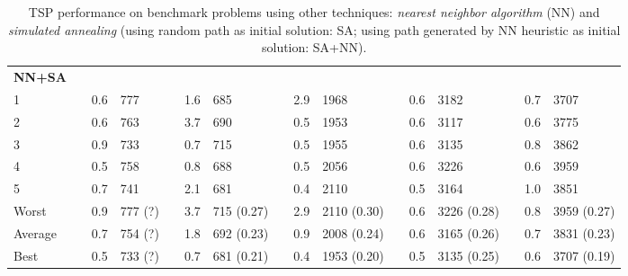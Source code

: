 \begin{sidewaystable}[hbpt]
{\begin{tabular} {l l S  l l S l l S l l S l l S l}
\\\midrule\addlinespace\addlinespace
\textbf{NN+SA}\\
1   &&  0.6 & 777 && 1.6 & 685  && 2.9 & 1968  && 0.6  & 3182 && 0.7 & 3707 \\
2   &&  0.6 & 763 && 3.7 & 690  && 0.5 & 1953 && 0.6 & 3117 && 0.6 & 3775   \\
3   &&  0.9 & 733 &&  0.7 & 715 && 0.5 & 1955 && 0.6 & 3135 && 0.8 & 3862    \\
4   &&  0.5 & 758 &&  0.8 &  688 && 0.5 & 2056 && 0.6 & 3226 && 0.6 & 3959 \\
5   &&  0.7 & 741 && 2.1  & 681  && 0.4 & 2110 && 0.5 & 3164 &&1.0 & 3851  \\ \addlinespace
Worst  && 0.9 &  777 (?) && 3.7 & 715 (0.27) && 2.9 & 2110 (0.30) && 0.6   &  3226 (0.28) && 0.8  &  3959 (0.27)  \\
Average&&   0.7 & 754 (?) && 1.8 & 692 (0.23) && 0.9   &   2008 (0.24) && 0.6    &  3165 (0.26) && 0.7  &  3831 (0.23)    \\
Best   &&  0.5 &  733 (?) && 0.7  & 681 (0.21)  && 0.4   & 1953  (0.20)&& 0.5  &  3135 (0.25) &&  0.6 &  3707 (0.19) \\  

\bottomrule
\end{tabular}}
\caption[TSP performance on benchmark problems using other techniques.]{TSP performance on benchmark problems using other techniques: \emph{nearest neighbor algorithm} (NN) and \emph{simulated annealing} (using random path as initial solution: SA; using path generated by NN heuristic as initial solution: SA+NN).}
\label{tab:other}
\end{sidewaystable}